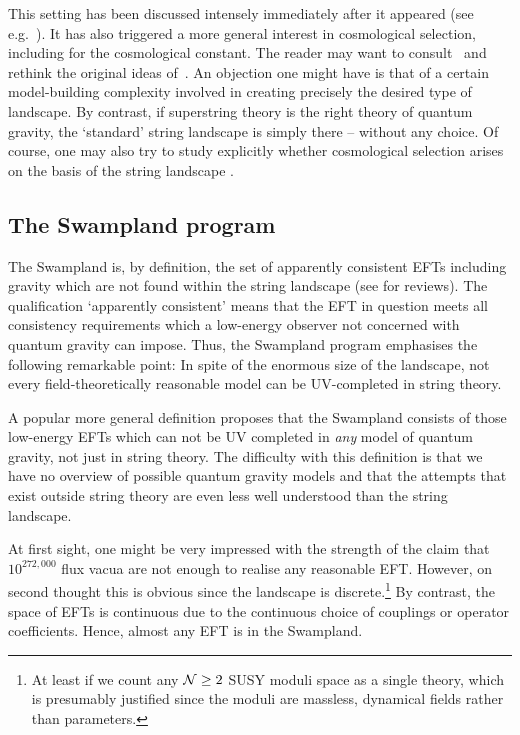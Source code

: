 \documentclass[12pt]{article}
\numberwithin{equation}{section}
\begin{document}
This setting has been discussed intensely immediately after it appeared (see e.g.~\cite{Espinosa:2015eda, Hardy:2015laa, Patil:2015oxa, Antipin:2015jia, Jaeckel:2015txa}). It has also triggered a more general interest in cosmological selection, including for the cosmological constant. The reader may want to consult~\cite{Arkani-Hamed:2016rle, Arvanitaki:2016xds, Alberte:2016izw, Geller:2018xvz, Cheung:2018xnu, Graham:2019bfu, Strumia:2019kxg, Giudice:2019iwl, Bloch:2019bvc, Kaloper:2019xfj} and rethink the original ideas of~\cite{Dvali:2003br, Dvali:2004tma}. An objection one might have is that of a certain model-building complexity involved in creating precisely the desired type of landscape. By contrast, if superstring theory is the right theory of quantum gravity, the `standard' string landscape is simply there -- without any choice. Of course, one may also try to study explicitly whether cosmological selection arises on the basis of the string landscape \cite{McAllister:2016vzi}.







\subsection{The Swampland program}\label{swpr}
The Swampland is, by definition, the set of apparently consistent EFTs including gravity which are not found within the string landscape \cite{Vafa:2005ui, Ooguri:2006in} (see \cite{Palti:2019pca, Brennan:2017rbf} for reviews). The qualification `apparently consistent' means that the EFT in question meets all consistency requirements which a low-energy observer not concerned with quantum gravity can impose. Thus, the Swampland program emphasises the following remarkable point: In spite of the enormous size of the landscape, not every field-theoretically reasonable model can be UV-completed in string theory.

A popular more general definition proposes that the Swampland consists of those low-energy EFTs which can not be UV completed in {\it any} model of quantum gravity, not just in string theory. The difficulty with this definition is that we have no overview of possible quantum gravity models and that the attempts that exist outside string theory are even less well understood than the string landscape.

At first sight, one might be very impressed with the strength of the claim that $10^{272,000}$  flux vacua \cite{Taylor:2015xtz} are not enough to realise any reasonable EFT. However, on second thought this is obvious since the landscape is discrete.\footnote{
At least if we count any ${\cal N}\ge 2$ SUSY moduli space as a single theory, which is presumably justified since the moduli are massless, dynamical fields rather than parameters.
}
By contrast, the space of EFTs is continuous due to the continuous choice of couplings or operator coefficients. Hence, almost any EFT is in the Swampland.
\end{document}
